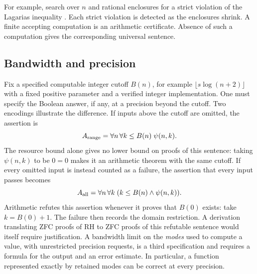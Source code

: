 \documentclass{article}
\theoremstyle{definition}
\begin{document}
For example, search over $n$ and rational enclosures for a strict
violation of the Lagarias inequality \cite{Lagarias2002}. Each
strict violation is detected as the enclosures shrink. A finite
accepting computation is an arithmetic certificate. Absence of
such a computation gives the corresponding universal sentence.

\subsection{Bandwidth and precision}
Fix a specified computable integer cutoff $B(n)$, for example
$\lfloor s\log(n+2)\rfloor$ with a fixed positive parameter and a verified
integer implementation. One must specify the Boolean answer, if any, at a
precision beyond the cutoff. Two encodings illustrate the difference. If
inputs above the cutoff are omitted, the assertion is
\[
  A_{\rm range}=\forall n\,\forall k\le B(n)\;\psi(n,k).
\]
The resource bound alone gives no lower bound on proofs of this sentence:
taking $\psi(n,k)$ to be $0=0$ makes it an arithmetic theorem with the
same cutoff. If every omitted input is instead counted as a failure, the
assertion that every input passes becomes
\[
  A_{\rm all}=\forall n\,\forall k\;(k\le B(n)\land\psi(n,k)).
\]
Arithmetic refutes this assertion whenever it proves that $B(0)$ exists:
take $k=B(0)+1$. The failure then records the domain restriction. A
derivation translating ZFC proofs of RH to ZFC proofs of this refutable
sentence would itself require justification. A bandwidth limit on the
\emph{modes} used to compute a value, with unrestricted precision requests,
is a third specification and requires a formula for the output and an
error estimate. In particular, a function represented exactly by retained
modes can be correct at every precision.
\end{document}
